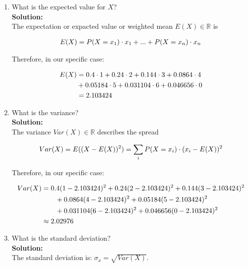\documentclass[a4paper]{article}
\begin{document}
\begin{enumerate}
\begin{enumerate}
	
	\item What is the expected value for $X$?\\
	\textbf{Solution:}\\
	
	
The expectation or expacted value or weighted mean $E(X) \in \mathbb{R}$ is

\begin{align}
	E(X) = P(X = x_1) \cdot x_1 + ... + P(X = x_n) \cdot x_n\notag
\end{align}	

Therefore, in our specific case:

\begin{align}
	E(X) &= 0.4 \cdot 1 + 0.24 \cdot 2 + 0.144 \cdot 3 + 0.0864 \cdot 4\notag\\
	 &+ 0.05184 \cdot 5 + 0.031104 \cdot 6 + 0.046656 \cdot 0\notag\\
	 &= 2.103424\notag
\end{align}
	
	
	
	\item What is the variance?\\
	\textbf{Solution:}\\
	
The variance $Var(X) \in \mathbb{R}$ describes the spread

\begin{align}
	Var(X) = E((X - E(X))^2) = \sum_i P(X = x_i) \cdot (x_i - E(X))^2\notag
\end{align}	
	
Therefore, in our specific case:

\begin{align}
	Var(X) &= 0.4(1 - 2.103424)^2 + 0.24(2 - 2.103424)^2 + 0.144(3 - 2.103424)^2\notag\\
	& \qquad + 0.0864(4 - 2.103424)^2 + 0.05184(5 - 2.103424)^2\notag\\
	& \qquad + 0.031104(6 - 2.103424)^2 + 0.046656(0 - 2.103424)^2\notag\\
	&\approx 2.02976\notag
\end{align}	
	
	


	\item What is the standard deviation?\\
	\textbf{Solution:}\\
	
The standard deviation is: $\sigma_x = \sqrt{Var(X)}$.



\end{enumerate}
\end{enumerate}
\end{document}
